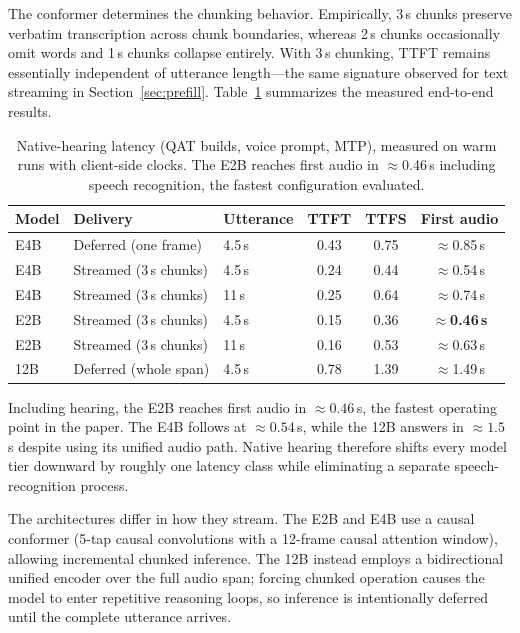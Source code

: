 \documentclass{article}
\begin{document}
The conformer determines the chunking behavior. Empirically, 3\,s chunks
preserve verbatim transcription across chunk boundaries, whereas 2\,s chunks
occasionally omit words and 1\,s chunks collapse entirely. With 3\,s chunking,
TTFT remains essentially independent of utterance length---the same signature
observed for text streaming in Section~\ref{sec:prefill}. Table~\ref{tab:native-hearing}
summarizes the measured end-to-end results.

\begin{table}[H]
\centering
\small
\begin{tabular}{l l l c c c}
\toprule
Model & Delivery & Utterance & TTFT & TTFS & First audio \\
\midrule
E4B & Deferred (one frame) & 4.5\,s & 0.43 & 0.75 & $\approx$0.85\,s \\
E4B & Streamed (3\,s chunks) & 4.5\,s & 0.24 & 0.44 & $\approx$0.54\,s \\
E4B & Streamed (3\,s chunks) & 11\,s & 0.25 & 0.64 & $\approx$0.74\,s \\
E2B & Streamed (3\,s chunks) & 4.5\,s & 0.15 & 0.36 & \textbf{$\approx$0.46\,s} \\
E2B & Streamed (3\,s chunks) & 11\,s & 0.16 & 0.53 & $\approx$0.63\,s \\
12B & Deferred (whole span) & 4.5\,s & 0.78 & 1.39 & $\approx$1.49\,s \\
\bottomrule
\end{tabular}
\caption{Native-hearing latency (QAT builds, voice prompt, MTP), measured on
warm runs with client-side clocks. The E2B reaches first audio in
$\approx$0.46\,s including speech recognition, the fastest configuration
evaluated.}
\label{tab:native-hearing}
\end{table}

Including hearing, the E2B reaches first audio in $\approx0.46$\,s, the
fastest operating point in the paper. The E4B follows at $\approx0.54$\,s,
while the 12B answers in $\approx1.5$\,s despite using its unified audio path.
Native hearing therefore shifts every model tier downward by roughly one
latency class while eliminating a separate speech-recognition process.

The architectures differ in how they stream. The E2B and E4B use a causal
conformer (5-tap causal convolutions with a 12-frame causal attention window),
allowing incremental chunked inference. The 12B instead employs a
bidirectional unified encoder over the full audio span; forcing chunked
operation causes the model to enter repetitive reasoning loops, so inference
is intentionally deferred until the complete utterance arrives.
\end{document}
